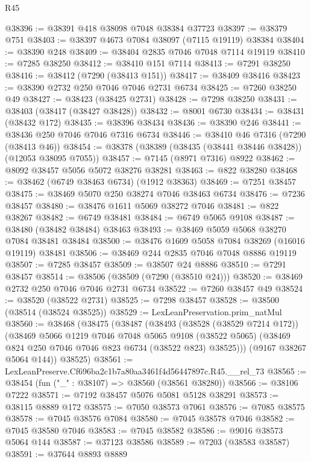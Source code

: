 \begin{lexlean}{R45}
\begin{coremodule}
{@38396 := @38391 @418 @38098 @7048 @38384 @37723
@38397 := @38379 @751
@38403 := @38397 @4673 @7084 @38097 (@7115 @19119) @38384
@38404 := @38390 @248
@38409 := @38404 @2835 @7046 @7048 @7114 @19119
@38410 := @7285 @38250
@38412 := @38410 @151 @7114
@38413 := @7291 @38250
@38416 := @38412 (@7290 (@38413 @151))
@38417 := @38409 @38416
@38423 := @38390 @2732 @250 @7046 @7046 @2731 @6734
@38425 := @7260 @38250 @49
@38427 := @38423 (@38425 @2731)
@38428 := @7298 @38250
@38431 := @38403 (@38417 (@38427 @38428))
@38432 := @8001 @6730
@38434 := @38431 (@38432 @172)
@38435 := @38396 @38434
@38436 := @38390 @246
@38441 := @38436 @250 @7046 @7046 @7316 @6734
@38446 := @38410 @46 @7316 (@7290 (@38413 @46))
@38454 := @38378 (@38389 (@38435 (@38441 @38446 @38428)) (@12053 @38095 @7055))
@38457 := @7145 (@8971 @7316) @8922
@38462 := @8092 @38457 @5056 @5072 @38276 @38281
@38463 := @822 @38280
@38468 := @38462 (@6749 @38463 @6734) (@1912 @38363)
@38469 := @7251 @38457
@38475 := @38469 @5070 @250 @38274 @7046 @38463 @6734
@38476 := @7236 @38457
@38480 := @38476 @1611 @5069 @38272 @7046
@38481 := @822 @38267
@38482 := @6749 @38481
@38484 := @6749 @5065 @9108
@38487 := @38480 (@38482 @38484) @38463
@38493 := @38469 @5059 @5068 @38270 @7084 @38481 @38484
@38500 := @38476 @1609 @5058 @7084 @38269 (@16016 @19119) @38481
@38506 := @38469 @244 @2835 @7046 @7048 @8886 @19119
@38507 := @7285 @38457
@38509 := @38507 @24 @8886
@38510 := @7291 @38457
@38514 := @38506 (@38509 (@7290 (@38510 @24)))
@38520 := @38469 @2732 @250 @7046 @7046 @2731 @6734
@38522 := @7260 @38457 @49
@38524 := @38520 (@38522 @2731)
@38525 := @7298 @38457
@38528 := @38500 (@38514 (@38524 @38525))
@38529 := LexLeanPreservation.prim_natMul
@38560 := @38468
    (@38475
      (@38487
        (@38493
          (@38528 (@38529 @7214 @172))
          (@38469
            @5066
            @1219
            @7046
            @7048
            @5065
            @9108
            (@38522 @5065)
            (@38469 @824 @250 @7046 @7046 @823 @6734 (@38522 @823) @38525)))
        (@9167 @38267 @5064 @144))
      @38525)
@38561 := LexLeanPreserve.Cf696ba2c1b7a80aa3461f4d56447897c.R45.__rel_73
@38565 := @38454 (fun ("_" : @38107) => @38560 (@38561 @38280))
@38566 := @38106 @7222
@38571 := @7192 @38457 @5076 @5081 @5128 @38291
@38573 := @38115 @8889 @172
@38575 := @7050 @38573 @7061
@38576 := @7085 @38575
@38578 := @7045 @38576 @7084
@38580 := @7045 @38578 @7046
@38582 := @7045 @38580 @7046
@38583 := @7045 @38582
@38586 := @9016 @38573 @5064 @144
@38587 := @37123 @38586
@38589 := @7203 (@38583 @38587)
@38591 := @37644 @8893 @8889
}
\end{coremodule}
\end{lexlean}
